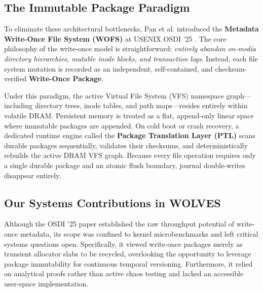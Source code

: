 \documentclass[conference]{IEEEtran}
\begin{document}
\subsection{The Immutable Package Paradigm}
To eliminate these architectural bottlenecks, Pan et al. introduced the \textbf{Metadata Write-Once File System (WOFS)} at USENIX OSDI '25 \cite{osdi25}. The core philosophy of the write-once model is straightforward: \textit{entirely abandon on-media directory hierarchies, mutable inode blocks, and transaction logs}. Instead, each file system mutation is recorded as an independent, self-contained, and checksum-verified \textbf{Write-Once Package}.

Under this paradigm, the active Virtual File System (VFS) namespace graph---including directory trees, inode tables, and path maps---resides entirely within volatile DRAM. Persistent memory is treated as a flat, append-only linear space where immutable packages are appended. On cold boot or crash recovery, a dedicated runtime engine called the \textbf{Package Translation Layer (PTL)} scans durable packages sequentially, validates their checksums, and deterministically rebuilds the active DRAM VFS graph. Because every file operation requires only a single durable package and an atomic flush boundary, journal double-writes disappear entirely.

\subsection{Our Systems Contributions in WOLVES}
Although the OSDI '25 paper established the raw throughput potential of write-once metadata, its scope was confined to kernel microbenchmarks and left critical systems questions open. Specifically, it viewed write-once packages merely as transient allocator slabs to be recycled, overlooking the opportunity to leverage package immutability for continuous temporal versioning. Furthermore, it relied on analytical proofs rather than active chaos testing and lacked an accessible user-space implementation.
\end{document}
